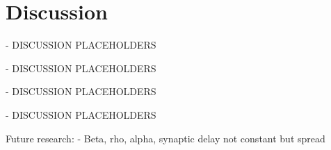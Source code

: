 \chapter{Discussion}\label{ch:discussion}


\begin{tcolorbox}[colback=orange]
- DISCUSSION PLACEHOLDERS
\vspace{20cm}
\end{tcolorbox}

\begin{tcolorbox}[colback=orange]
- DISCUSSION PLACEHOLDERS
\vspace{20cm}
\end{tcolorbox}

\begin{tcolorbox}[colback=orange]
- DISCUSSION PLACEHOLDERS
\vspace{20cm}
\end{tcolorbox}

\begin{tcolorbox}[colback=orange]
- DISCUSSION PLACEHOLDERS
\vspace{20cm}
\end{tcolorbox}


\begin{tcolorbox}[colback=orange]
Future research:
- Beta, rho, alpha, synaptic delay not constant but spread
\end{tcolorbox}
